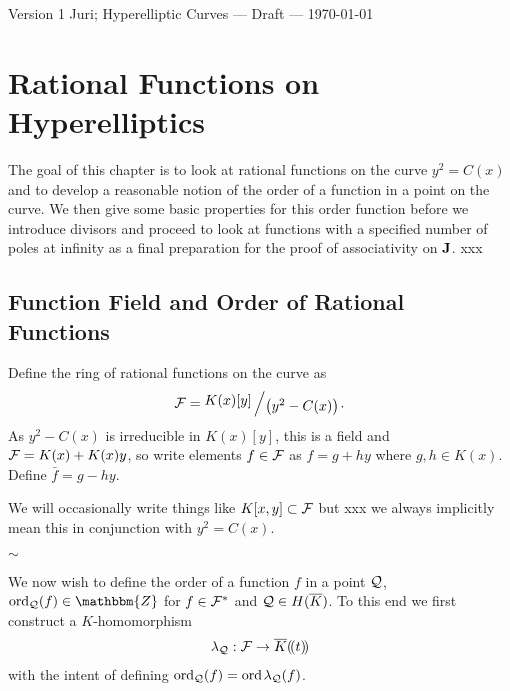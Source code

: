 \documentclass[english,11pt,a4paper]{article}
\begin{document}
Version 1 \scriptsize \hfill Juri; Hyperelliptic Curves --- Draft --- \today
\normalsize

\section{Rational Functions on Hyperelliptics}

The goal of this chapter is to look at rational functions on the curve $y^2 = C(x)$ and to develop a reasonable notion of the order of a function in a point on the curve. We then give some basic properties for this order function before we introduce divisors and proceed to look at functions with a specified number of poles at infinity as a final preparation for the proof of associativity on $\mathbf{J}$. xxx %

\subsection{Function Field and Order of Rational Functions}

\begin{defin}
	Define the ring of rational functions on the curve as
	\begin{align*}
	  \F = \bigslant{K(x)[y]}{\big(y^2-C(x)\big)}.
	\end{align*}
  As $y^2-C(x)$ is irreducible in $K(x)[y]$, this is a field
  and $\mathcal{F} = K(x) + K(x) y$, so write elements $f \in \mathcal{F}$ as $f = g + hy$ where $g,h \in K(x)$. Define $\bar f = g - hy$.

  We will occasionally write things like $K[x,y] \subset \mathcal{F}$ but xxx we always implicitly mean this in conjunction with $y^2=C(x)$.
\end{defin}

\begin{center}
$\sim$
\end{center}

We now wish to define the order of a function $f$ in a point $\mathcal{Q}$, $\ordq (f) \in \mathbbm{Z}$ for $f \in \mathcal{F}^*$ and $\mathcal{Q} \in H(\overline K)$. To this end we first construct a $K$-homomorphism
\begin{align*}
  \lambda_{\mathcal{Q}}: \mathcal{F} \rightarrow \overline K (\! (t)\! )
\end{align*}
with the intent of defining $\text{ord}_{\mathcal{Q}}(f) = \text{ord\hspace{0.4mm}} \lambda_{\mathcal{Q}} (f)$.
\end{document}
